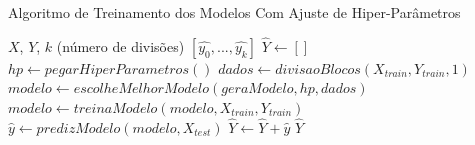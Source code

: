 \begin{algorithm}
\caption{Algoritmo de Treinamento dos Modelos Com Ajuste de Hiper-Parâmetros}
\begin{algorithmic}
\label{algo:tuned_training}
\REQUIRE $X$, $Y$, $k$ (número de divisões)
\ENSURE $[\hat{y_0}, ..., \hat{y_k}]$
\STATE $\hat{Y} \leftarrow [] $ 
\newline
{} 
    \STATE $hp \leftarrow pegarHiperParametros()$
    \STATE $dados \leftarrow divisaoBlocos(X_{train}, Y_{train}, 1)$
    \STATE $modelo \leftarrow escolheMelhorModelo(geraModelo, hp, dados)$
    \newline
    \STATE $modelo \leftarrow treinaModelo(modelo, X_{train}, Y_{train})$ 
    \newline
    \STATE $\hat{y} \leftarrow predizModelo(modelo, X_{test}) $
    \STATE $\hat{Y} \leftarrow \hat{Y} + \hat{y}$
    \newline
\ENDFOR
\newline
\RETURN $\hat{Y}$
\end{algorithmic}
\end{algorithm}